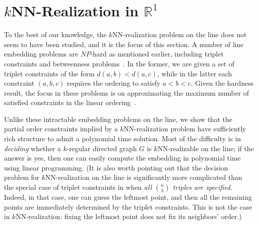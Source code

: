 \newcommand{\coeff}[1]{C_{#1}}
\newcommand{\partcoeff}[2]{C_{#2}^{#1}}
\newcommand{\yleft}{y^-}
\newcommand{\yright}{y^+}

\section{\texorpdfstring{$k$}{k}NN-Realization in \texorpdfstring{$\mathbb{R}^1$}{R1}} \label{sec-1D}

To the best of our knowledge, the $k$NN-realization problem on the line does not seem to have been studied, and it is the focus of this section. A number of line embedding problems are $NP$-hard as mentioned earlier, including triplet constraints and betweenness problems~\cite{ChorSudan}. In the former, we are given a set of triplet constraints of the form $d(a,b) < d(a,c)$, while in the latter each constraint $(a,b,c)$ requires the ordering to satisfy $a < b < c$. Given the hardness result, the focus in these problems is on approximating the maximum number of satisfied constraints in the linear ordering~\cite{fan2020}. 

Unlike these intractable embedding problems on the line, we show that the partial order constraints implied by a $k$NN-realization problem have sufficiently  rich structure to admit a polynomial time solution. Most of the difficulty is in \emph{deciding} whether a $k$-regular directed graph $G$ is $k$NN-realizable on the line; if the answer is yes, then one can easily compute the embedding in polynomial time using linear programming.
(It is also worth pointing out that the decision problem for $k$NN-realization on the line is significantly more complicated than the special case of triplet constraints in \cite{fan2020} when \emph{all $\binom{n}{3}$ triples are specified}. Indeed, in that case, one can guess the leftmost point, and then all the remaining points are immediately determined by the triplet constraints. This is not the case in $k$NN-realization: fixing the leftmost point does not fix its neighbors' order.) 

